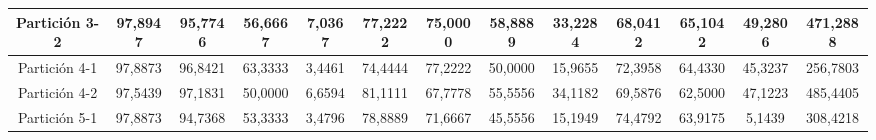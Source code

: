 \documentclass[12pt]{article}
\begin{document}
\begin{table}[H]
{\begin{tabular}{|c|cccc|cccc|cccc|}
Partición 3-2 & \multicolumn{1}{c|}{97,8947}                                                  & \multicolumn{1}{c|}{95,7746}                                                 & \multicolumn{1}{c|}{56,6667} & 7,0367 & \multicolumn{1}{c|}{77,2222}                                                  & \multicolumn{1}{c|}{75,0000}                                                 & \multicolumn{1}{c|}{58,8889} & 33,2284 & \multicolumn{1}{c|}{68,0412}                                                  & \multicolumn{1}{c|}{65,1042}                                                 & \multicolumn{1}{c|}{49,2806} & 471,2888 \\ \hline
Partición 4-1 & \multicolumn{1}{c|}{97,8873}                                                  & \multicolumn{1}{c|}{96,8421}                                                 & \multicolumn{1}{c|}{63,3333} & 3,4461 & \multicolumn{1}{c|}{74,4444}                                                  & \multicolumn{1}{c|}{77,2222}                                                 & \multicolumn{1}{c|}{50,0000} & 15,9655 & \multicolumn{1}{c|}{72,3958}                                                  & \multicolumn{1}{c|}{64,4330}                                                 & \multicolumn{1}{c|}{45,3237} & 256,7803 \\ \hline
Partición 4-2 & \multicolumn{1}{c|}{97,5439}                                                  & \multicolumn{1}{c|}{97,1831}                                                 & \multicolumn{1}{c|}{50,0000} & 6,6594 & \multicolumn{1}{c|}{81,1111}                                                  & \multicolumn{1}{c|}{67,7778}                                                 & \multicolumn{1}{c|}{55,5556} & 34,1182 & \multicolumn{1}{c|}{69,5876}                                                  & \multicolumn{1}{c|}{62,5000}                                                 & \multicolumn{1}{c|}{47,1223} & 485,4405 \\ \hline
Partición 5-1 & \multicolumn{1}{c|}{97,8873}                                                  & \multicolumn{1}{c|}{94,7368}                                                 & \multicolumn{1}{c|}{53,3333} & 3,4796 & \multicolumn{1}{c|}{78,8889}                                                  & \multicolumn{1}{c|}{71,6667}                                                 & \multicolumn{1}{c|}{45,5556} & 15,1949 & \multicolumn{1}{c|}{74,4792}                                                  & \multicolumn{1}{c|}{63,9175}                                                 & \multicolumn{1}{c|}{5,1439}  & 308,4218 \\ \hline

\end{tabular}}
\end{table}
\end{document}
